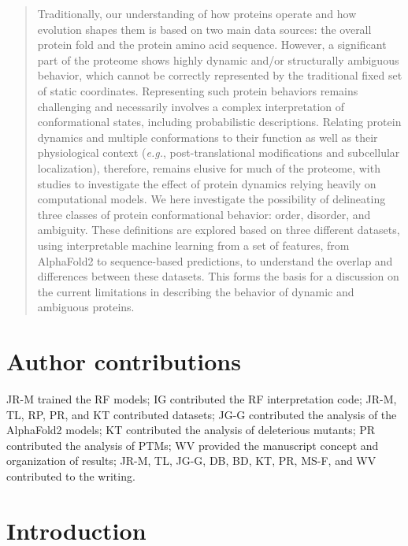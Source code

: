 \begin{abstract}
    Traditionally, our understanding of how proteins operate and how evolution shapes them is based on two main data sources: the overall protein fold and the protein amino acid sequence. However, a significant part of the proteome shows highly dynamic and/or structurally ambiguous behavior, which cannot be correctly represented by the traditional fixed set of static coordinates. Representing such protein behaviors remains challenging and necessarily involves a complex interpretation of conformational states, including probabilistic descriptions. Relating protein dynamics and multiple conformations to their function as well as their physiological context (\textit{e.g.}, post-translational modifications and subcellular localization), therefore, remains elusive for much of the proteome, with studies to investigate the effect of protein dynamics relying heavily on computational models. We here investigate the possibility of delineating three classes of protein conformational behavior: order, disorder, and ambiguity. These definitions are explored based on three different datasets, using interpretable machine learning from a set of features, from AlphaFold2 to sequence-based predictions, to understand the overlap and differences between these datasets. This forms the basis for a discussion on the current limitations in describing the behavior of dynamic and ambiguous proteins.
\end{abstract}

\section*{Author contributions}

JR-M trained the RF models; IG contributed the RF interpretation code; JR-M, TL, RP, PR, and KT contributed datasets; JG-G contributed the analysis of the AlphaFold2 models; KT contributed the analysis of deleterious mutants; PR contributed the analysis of PTMs; WV provided the manuscript concept and organization of results; JR-M, TL, JG-G, DB, BD, KT, PR, MS-F, and WV contributed to the writing.

\newpage

\section{Introduction}

